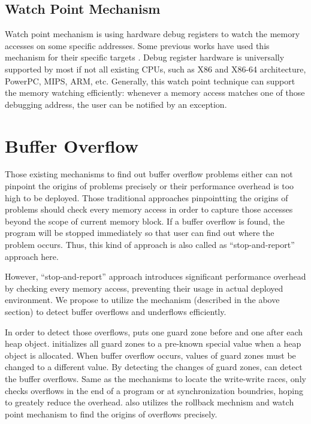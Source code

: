 \subsection{Watch Point Mechanism}
\label{sec:watchpoint}

Watch point mechanism is using hardware debug registers to watch the memory accesses on
some specific addresses. Some previous works have used this mechanism 
for their specific targets \cite{fastboundschecking}. 
Debug register hardware is universally supported by most if not all existing CPUs, such as
X86 and X86-64 architecture, PowerPC, MIPS, ARM, etc. 
Generally, this watch point technique can support the memory watching efficiently: whenever
a memory access matches one of those debugging address, the user can be notified by an exception.

\section{Buffer Overflow}
Those existing mechanisms to find out buffer overflow problems either can not pinpoint the origins of
problems precisely or their performance overhead is too high to be deployed. 
Those traditional approaches pinpointting the origins of problems should 
check every memory access in order to capture those accesses beyond the scope of 
current memory block. 
If a buffer overflow is found, the program will be stopped immediately 
so that user can find out where the problem occurs.
Thus, this kind of approach is also called as ``stop-and-report'' approach here. 

However, ``stop-and-report'' approach introduces significant performance overhead by 
checking every memory access,  
preventing their usage in actual deployed environment. 
We propose to utilize the \stopgap{} mechanism (described in the above section) 
to detect buffer overflows and underflows efficiently. 

In order to detect those overflows, \stopgap{} puts one guard zone before and 
one after each heap object. \stopgap{} initializes all guard zones to a pre-known special 
value when a heap object is allocated.
When buffer overflow occurs, values of guard zones must be changed to a different value.
By detecting the changes of guard zones, \stopgap{} can detect the buffer overflows. 
Same as the mechanisms to locate the write-write races, \stopgap{} only checks overflows 
in the end of a program or at synchronization boundries, hoping to greately reduce
the overhead.  
\stopgap{} also utilizes the rollback mechnism and watch point mechanism to find
the origins of overflows precisely.

